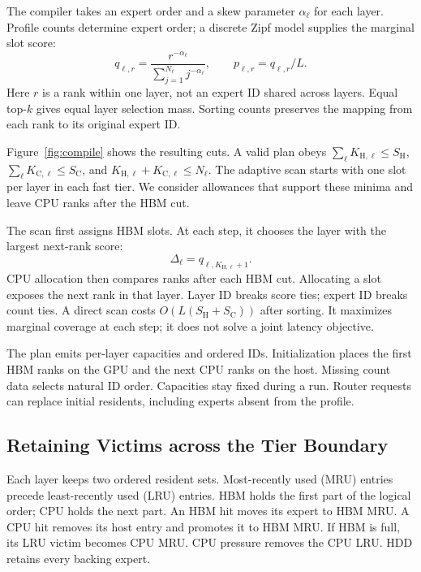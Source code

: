 \documentclass[conference,9pt,letterpaper]{IEEEtran}
\begin{document}
The compiler takes an expert order and a skew parameter $\alpha_\ell$ for each layer. Profile counts determine expert order; a discrete Zipf model supplies the marginal slot score:
\begin{equation}
q_{\ell,r}=\frac{r^{-\alpha_\ell}}{\sum_{j=1}^{N_\ell}j^{-\alpha_\ell}},
\qquad p_{\ell,r}=q_{\ell,r}/L.
\end{equation}
Here $r$ is a rank within one layer, not an expert ID shared across layers. Equal top-$k$ gives equal layer selection mass. Sorting counts preserves the mapping from each rank to its original expert ID.

Figure~\ref{fig:compile} shows the resulting cuts. A valid plan obeys $\sum_\ell K_{\mathrm H,\ell}\le S_{\mathrm H}$, $\sum_\ell K_{\mathrm C,\ell}\le S_{\mathrm C}$, and $K_{\mathrm H,\ell}+K_{\mathrm C,\ell}\le N_\ell$. The adaptive scan starts with one slot per layer in each fast tier. We consider allowances that support these minima and leave CPU ranks after the HBM cut.

The scan first assigns HBM slots. At each step, it chooses the layer with the largest next-rank score:
\begin{equation}
\Delta_\ell=q_{\ell,K_{\mathrm H,\ell}+1}.
\end{equation}
CPU allocation then compares ranks after each HBM cut. Allocating a slot exposes the next rank in that layer. Layer ID breaks score ties; expert ID breaks count ties. A direct scan costs $O(L(S_{\mathrm H}+S_{\mathrm C}))$ after sorting. It maximizes marginal coverage at each step; it does not solve a joint latency objective.

The plan emits per-layer capacities and ordered IDs. Initialization places the first HBM ranks on the GPU and the next CPU ranks on the host. Missing count data selects natural ID order. Capacities stay fixed during a run. Router requests can replace initial residents, including experts absent from the profile.

\subsection{Retaining Victims across the Tier Boundary}
Each layer keeps two ordered resident sets. Most-recently used (MRU) entries precede least-recently used (LRU) entries. HBM holds the first part of the logical order; CPU holds the next part. An HBM hit moves its expert to HBM MRU. A CPU hit removes its host entry and promotes it to HBM MRU. If HBM is full, its LRU victim becomes CPU MRU. CPU pressure removes the CPU LRU. HDD retains every backing expert.
\end{document}
